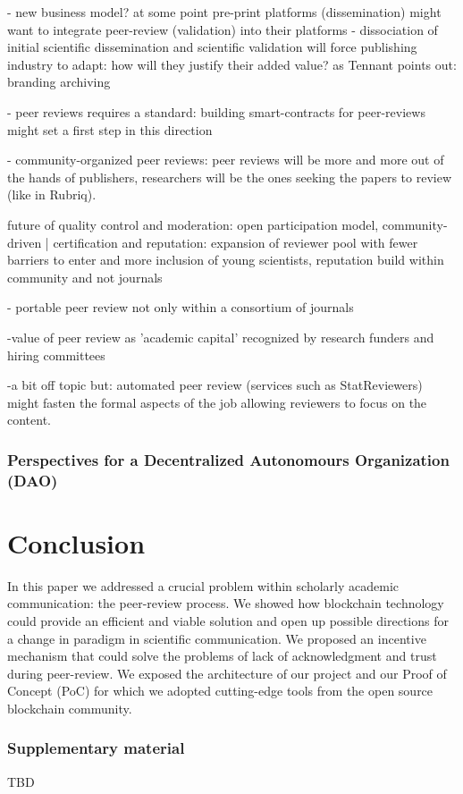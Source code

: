 \documentclass[runningheads]{llncs}
\begin{document}
{- new business model? at some point pre-print platforms (dissemination) might want to integrate peer-review (validation) into their platforms - dissociation of initial scientific dissemination and scientific validation will force publishing industry to adapt: how will they justify their added value? as Tennant points out: branding archiving

- peer reviews requires a standard: building smart-contracts for peer-reviews might set a first step in this direction

- community-organized peer reviews: peer reviews will be more and more out of the hands of publishers, researchers will be the ones seeking the papers to review (like in Rubriq).

future of quality control and moderation: open participation model, community-driven | certification and reputation: expansion of reviewer pool with fewer barriers to enter and more inclusion of young scientists, reputation build within community and not journals

- portable peer review not only within a consortium of journals

-value of peer review as 'academic capital' recognized by research funders and hiring committees

-a bit off topic but: automated peer review (services such as StatReviewers) might fasten the formal aspects of the job allowing reviewers to focus on the content.

\subsubsection{Perspectives for a Decentralized Autonomours Organization (DAO)}

\section{Conclusion}
In this paper we addressed a crucial problem within scholarly academic communication: the peer-review process. We showed how blockchain technology could provide an efficient and viable solution and open up possible directions for a change in paradigm in scientific communication. We proposed an incentive mechanism that could solve the problems of lack of acknowledgment and trust during peer-review. We exposed the architecture of our project and our Proof of Concept (PoC) for which we adopted cutting-edge tools from the open source blockchain community.

\subsubsection{Supplementary material}
TBD

}
\end{document}
